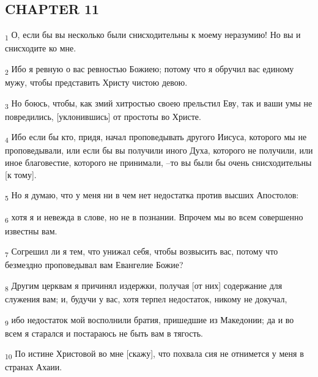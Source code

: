 \subsection{CHAPTER 11}
\begin{tcolorbox}
\textsubscript{1} О, если бы вы несколько были снисходительны к моему неразумию! Но вы и снисходите ко мне.
\end{tcolorbox}
\begin{tcolorbox}
\textsubscript{2} Ибо я ревную о вас ревностью Божиею; потому что я обручил вас единому мужу, чтобы представить Христу чистою девою.
\end{tcolorbox}
\begin{tcolorbox}
\textsubscript{3} Но боюсь, чтобы, как змий хитростью своею прельстил Еву, так и ваши умы не повредились, [уклонившись] от простоты во Христе.
\end{tcolorbox}
\begin{tcolorbox}
\textsubscript{4} Ибо если бы кто, придя, начал проповедывать другого Иисуса, которого мы не проповедывали, или если бы вы получили иного Духа, которого не получили, или иное благовестие, которого не принимали, --то вы были бы очень снисходительны [к тому].
\end{tcolorbox}
\begin{tcolorbox}
\textsubscript{5} Но я думаю, что у меня ни в чем нет недостатка против высших Апостолов:
\end{tcolorbox}
\begin{tcolorbox}
\textsubscript{6} хотя я и невежда в слове, но не в познании. Впрочем мы во всем совершенно известны вам.
\end{tcolorbox}
\begin{tcolorbox}
\textsubscript{7} Согрешил ли я тем, что унижал себя, чтобы возвысить вас, потому что безмездно проповедывал вам Евангелие Божие?
\end{tcolorbox}
\begin{tcolorbox}
\textsubscript{8} Другим церквам я причинял издержки, получая [от них] содержание для служения вам; и, будучи у вас, хотя терпел недостаток, никому не докучал,
\end{tcolorbox}
\begin{tcolorbox}
\textsubscript{9} ибо недостаток мой восполнили братия, пришедшие из Македонии; да и во всем я старался и постараюсь не быть вам в тягость.
\end{tcolorbox}
\begin{tcolorbox}
\textsubscript{10} По истине Христовой во мне [скажу], что похвала сия не отнимется у меня в странах Ахаии.
\end{tcolorbox}

